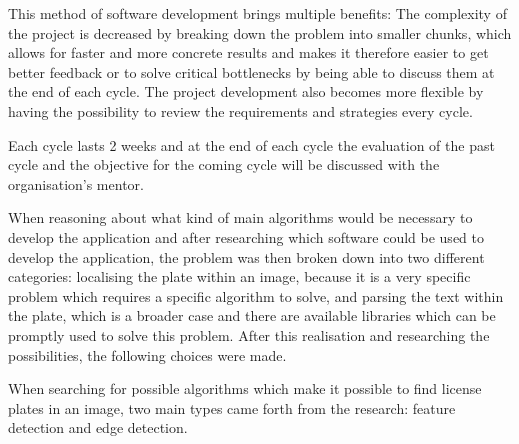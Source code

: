 This method of software development brings multiple benefits: The complexity of the project is decreased by breaking down the problem into smaller chunks, which allows for faster and more concrete results and makes it therefore easier to get better feedback or to solve critical bottlenecks by being able to discuss them at the end of each cycle. The project development also becomes more flexible by having the possibility to review the requirements and strategies every cycle.

Each cycle lasts 2 weeks and at the end of each cycle the evaluation of the past cycle and the objective for the coming cycle will be discussed with the organisation's mentor.


When reasoning about what kind of main algorithms would be necessary to develop the application and after researching which software could be used to develop the application, the problem was then broken down into two different categories: localising the plate within an image, because it is a very specific problem which requires a specific algorithm to solve, and parsing the text within the plate, which is a broader case and there are available libraries which can be promptly used to solve this problem. After this realisation and researching the possibilities, the following choices were made.


When searching for possible algorithms which make it possible to find license plates in an image, two main types came forth from the research: feature detection and edge detection. 

